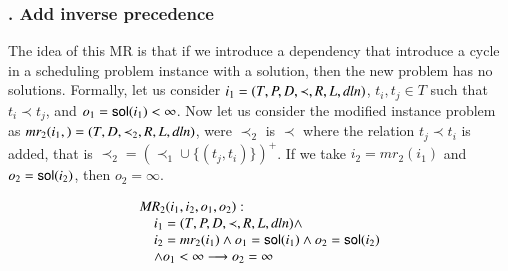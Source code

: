 \subsubsection{. Add inverse precedence}
The idea of this MR is that if we introduce a dependency that
introduce a cycle in a scheduling problem instance with a solution,
then the new problem has no solutions. Formally,
let us consider $i_{1}=(T, P, D, \prec, R, L, \mathit{dln})$,
$t_{i}, t_{j}\in T$ such that $t_{i}\prec t_{j}$, and
$o_{1}=\mathsf{sol}(i_{1})<\infty$.
Now let us consider
the modified instance problem as $mr_{2}(i_{1},)=(T, D, \prec_{2}, R, L,
\mathit{dln})$,
were $\prec_{2}$ is $\prec$ where the relation $t_{j}\prec t_{i}$ is
added, that is $\prec_{2}= (\prec_{1}\cup \{(t_{j}, t_{i})\})^{+}$.
If we take $i_{2}=mr_{2}(i_{1})$ and $o_{2}=\mathsf{sol}(i_{2})$, then
$o_{2}=\infty$.

\begin{framed}
  \begin{displaymath}
      \begin{array}{l}
    \mathit{MR}_{2}(i_1,i_2,o_{1},o_{2}):\\
      \hskip 1em i_1=(T,P,D,\prec,R,L,\mathit{dln})\wedge  \\
      \hskip 1em  i_2=mr_2(i_1)\wedge o_{1}=\mathsf{sol}(i_{1})\wedge o_{2}=\mathsf{sol}(i_2)\\
      \hskip 1em \wedge o_{1}<\infty
      \longrightarrow o_2=\infty
    \end{array}
  \end{displaymath}
\end{framed}







